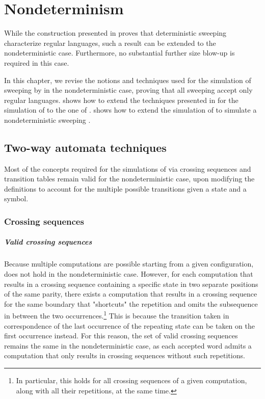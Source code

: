 \chapter{Nondeterminism}\label{ch:nondetsweep}
While the construction presented in  proves that deterministic sweeping \kLAs characterize regular languages, such a result can be extended to the nondeterministic case.
Furthermore, no substantial further size blow-up is required in this case.

In this chapter, we revise the notions and techniques used for the simulation of sweeping \kDLAs by \ONFAs in the nondeterministic case, proving that all sweeping \kLAs accept only regular languages.
 shows how to extend the techniques presented in  for the simulation of \TDFAs to the one of \TNFAs.
 shows how to extend the simulation of  to simulate a nondeterministic sweeping \kLA.



\section{Two-way automata techniques}\label{sec:nondet-techniques}
Most of the concepts required for the simulations of \TNFAs via crossing sequences and transition tables remain valid for the nondeterministic case, upon modifying the definitions to account for the multiple possible transitions given a state and a symbol.


\subsection{Crossing sequences}

\paragraph{Valid crossing sequences} Because multiple computations are possible starting from a given configuration,  does not hold in the nondeterministic case.
However, for each computation that results in a crossing sequence containing a specific state in two separate positions of the same parity, there exists a computation that results in a crossing sequence for the same boundary that "shortcuts" the repetition and omits the subsequence in between the two occurrences.\footnote{%
	In particular, this holds for all crossing sequences of a given computation, along with all their repetitions, at the same time.}
This is because the transition taken in correspondence of the last occurrence of the repeating state can be taken on the first occurrence instead.
For this reason, the set of valid crossing sequences remains the same in the nondeterministic case, as each accepted word admits a computation that only results in crossing sequences without such repetitions.

